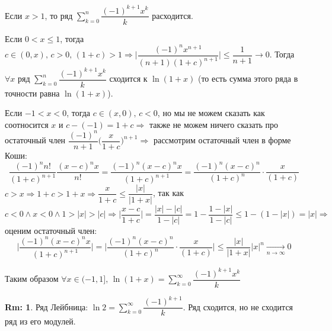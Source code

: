 \documentclass[12pt]{article}
\theoremstyle{definition}
\newtheorem{rem}{Rm:}
\begin{document}
Если $x > 1$, то ряд $ \displaystyle \sum\limits_{k = 0}^{n}\dfrac{(-1)^{k+1} x^k}{k}$ расходится.

Если $0 < x \leq 1$, тогда $c \in(0,x), \, c > 0, \, (1 + c) > 1  \Rightarrow \bigg|\dfrac{(-1)^{n}x^{n+1}}{(n+1)(1+c)^{n+1}}\bigg| \leq \dfrac{1}{n+1} \to 0$.  Тогда $\forall x$ ряд $\displaystyle \sum\limits_{k = 0}^{n}\dfrac{(-1)^{k+1} x^k}{k}$ сходится к $\ln(1+x)$ (то есть сумма этого ряда в точности равна $\ln(1+x)$). 

Если $-1 < x < 0$, тогда $c \in (x,0),\, c < 0$, но мы не можем сказать как соотносится $x$ и $c - (-1) = 1+c \Rightarrow$ также не можем ничего сказать про остаточный член $\dfrac{(-1)^n}{n+1}\bigg( \dfrac{x}{1+c}\bigg)^{n+1} \Rightarrow$ рассмотрим остаточный член в форме Коши:
$$\dfrac{(-1)^n n!}{(1+c)^{n+1}}\dfrac{(x-c)^n x}{n!} = \dfrac{(-1)^n (x - c)^n x}{(1+c)^{n+1}} = \dfrac{(-1)^n (x - c)^n}{(1+c)^{n}}{\cdot}\dfrac{x}{(1+c)}$$
$c > x \Rightarrow 1+c > 1 + x \Rightarrow \dfrac{x}{1+c}\leq \dfrac{|x|}{|1+x|}$, так как $c< 0 \wedge x <0 \wedge 1 > |x| > |c| \Rightarrow \bigg|\dfrac{x-c}{1+c} \bigg| = \dfrac{|x| - |c|}{1 - |c|} = 1 - \dfrac{1 - |x|}{1-|c|} \leq 1 - (1-|x|) = |x| \Rightarrow
$ оценим остаточный член:
$$
\bigg|\dfrac{(-1)^n (x - c)^n x}{(1+c)^{n+1}}\bigg|  = \bigg|\dfrac{(-1)^n (x - c)^n}{(1+c)^{n}}{\cdot}\dfrac{x}{(1+c)}\bigg|\leq \dfrac{|x|}{|1+x|}|x|^n \xrightarrow[n \to \infty]{} 0
$$

Таким образом $\forall x \in (-1,1], \, \ln{(1+x)} = \displaystyle \sum\limits_{k = 0}^{\infty}\dfrac{(-1)^{k+1} x^k}{k}$

\begin{rem}
	Ряд Лейбница: $\ln{2} =\displaystyle \sum\limits_{k = 0}^{\infty}\dfrac{(-1)^{k+1}}{k}$. Ряд сходится, но не сходится ряд из его модулей.
\end{rem}
\end{document}
